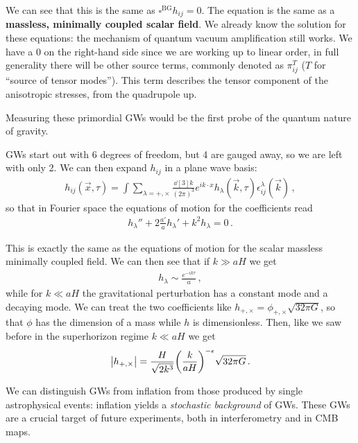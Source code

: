 \documentclass[main.tex]{subfiles}
\begin{document}
We can see that this is the same as \(\square^{\text{BG}} h_{ij} = 0\). The equation is the same as a \textbf{massless, minimally coupled scalar field}. 
We already know the solution for these equations: the mechanism of quantum vacuum amplification still works. 
We have a 0 on the right-hand side since we are working up to linear order, in full generality there will be other source terms, commonly denoted as \(\pi^{T}_{ij}\) (\(T\) for ``source of tensor modes''). 
This term describes the tensor component of the anisotropic stresses, from the quadrupole up.

Measuring these primordial GWs would be the first probe of the quantum nature of gravity.

GWs start out with 6 degrees of freedom, but 4 are gauged away, so we are left with only 2. 
We can then expand \(h_{ij}\) in a plane wave basis: 
%
\begin{align}
h_{ij} (\vec{x}, \tau )
= \int  \sum_{\lambda = +, \times }
\frac{ \dd[3]{k}}{(2 \pi )^3}
e^{i k \cdot x}
h_\lambda (\vec{k}, \tau ) \epsilon^\lambda_{ij} (\vec{k})
\,,
\end{align}
%
so that in Fourier space the equations of motion for the coefficients read
%
\begin{align}
h_\lambda'' + 2 \frac{a'}{a} h_\lambda' + k^2 h_\lambda = 0
\,.
\end{align}

This is exactly the same as the equations of motion for the scalar massless minimally coupled field. 
We can then see that if \(k \gg aH\) we get 
%
\begin{align}
h_\lambda \sim \frac{e^{-ik \tau }}{a}
\,,
\end{align}
%
while for \(k \ll aH\) the gravitational perturbation has a constant mode and a decaying mode. 
We can treat the two coefficients like \(h_{+, \times } = \phi_{+, \times } \sqrt{32 \pi G}\), 
so that \(\phi \) has the dimension of a mass while \(h\) is dimensionless. 
Then, like we saw before in the superhorizon regime \(k\ll aH\) we get
%
\begin{align}
\abs{h_{+, \times }} = \frac{H}{\sqrt{2 k^3}}
\qty( \frac{k}{aH})^{-\epsilon } \sqrt{32 \pi G}
\,.
\end{align}

We can distinguish GWs from inflation from those produced by single astrophysical events: inflation yields a \emph{stochastic background} of GWs. 
These GWs are a crucial target of future experiments, both in interferometry and in CMB maps. 
\end{document}
